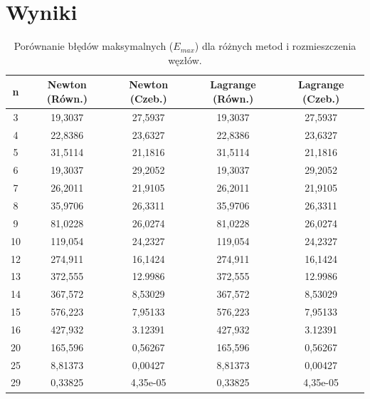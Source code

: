 \documentclass{article}
\begin{document}
\section{Wyniki}
\begin{table}[htbp]
\centering
\caption{Porównanie błędów maksymalnych ($E_{max}$) dla różnych metod i rozmieszczenia węzłów.}
\label{tab:max_error}
\begin{tabular}{@{}ccccc@{}}
\toprule
\textbf{n} & \textbf{Newton (Równ.)} & \textbf{Newton (Czeb.)} & \textbf{Lagrange (Równ.)} & \textbf{Lagrange (Czeb.)} \\ \midrule
3          & 19,3037                 & 27,5937                 & 19,3037                   & 27,5937                   \\
4          & 22,8386                 & 23,6327                 & 22,8386                   & 23,6327                   \\
5          & 31,5114                 & 21,1816                 & 31,5114                   & 21,1816                   \\
6          & 19,3037                 & 29,2052                 & 19,3037                   & 29,2052                   \\
7          & 26,2011                 & 21,9105                 & 26,2011                   & 21,9105                   \\
8          & 35,9706                 & 26,3311                 & 35,9706                   & 26,3311                   \\
9          & 81,0228                 & 26,0274                 & 81,0228                   & 26,0274                   \\
10         & 119,054                 & 24,2327                 & 119,054                   & 24,2327                   \\
12         & 274,911                 & 16,1424                 & 274,911                   & 16,1424                   \\
13         & 372,555                 & 12.9986                 & 372,555                   & 12.9986                   \\
14         & 367,572                 & 8,53029                 & 367,572                   & 8,53029                   \\
15         & 576,223                 & 7,95133                 & 576,223                   & 7,95133                   \\
16         & 427,932                 & 3.12391                 & 427,932                   & 3.12391                   \\
20         & 165,596                 & 0,56267                 & 165,596                   & 0,56267                   \\
25         & 8,81373                 & 0,00427                 & 8,81373                   & 0,00427                   \\
29         & 0,33825                 & 4,35e-05                & 0,33825                   & 4,35e-05                  \\ \bottomrule
\end{tabular}
\end{table}
\end{document}
